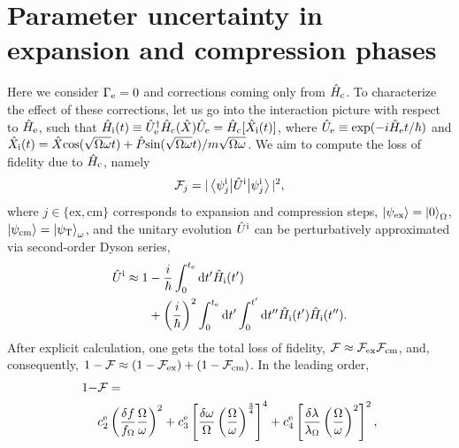 \documentclass[reprint,prx,footinbib,floatfix,twocolumn,longbibliography,superscriptaddress]{revtex4-2}
\begin{document}
\section{Parameter uncertainty in expansion and compression phases}
\label{appC}
Here we consider $\Gamma_{\text{e}} = 0$ and corrections coming only from $\hat{H}_\text{c}$.
To characterize the effect of these corrections, let us go into the interaction picture with respect to $\hat{H}_{\text{e}}$, such that $\hat{H}_\text{i} (t) \equiv \hat{U}_{\text{e}}^{\dagger} \hat{H}_\text{c} (\hat{X}) \hat{U}_{\text{e}} = \hat{H}_\text{c} [\hat{X}_{\text{i}}(t)]$, where $\hat{U}_{\text{e}} \equiv \text{exp}(- i \hat{H}_{\text{e}} t / \hbar)$ and $\hat{X}_{\text{i}} (t) = \hat{X}  \text{cos}(\sqrt{\Omega \omega } t) + \hat{P} \text{sin}(\sqrt{\Omega \omega }t) / m \sqrt{\Omega \omega } $.
We aim to compute the loss of fidelity due to $\hat{H}_\text{c}$, namely
\begin{equation}
    \mathcal{F}_j = | \expval{ \hat{U}^{\text{i}}}{ \psi_j^{\text{i}}} |^2, 
\end{equation}
where $j \in \{\text{ex},\text{cm}\}$ corresponds to expansion and compression steps, $\ket{\psi_\text{ex}} = \ket{0}_{\Omega}$, $\ket{\psi_\text{cm}} = \ket{\psi_\text{T}}_{\omega}$, and the unitary evolution $\hat{U}^{\text{i}}$ can be perturbatively approximated via second-order Dyson series,
\begin{align}
     \hat{U}^{\text{i}} \approx 1 &- \frac{i}{\hbar} \int_0^{t_{\text{e}}} \dd t' \hat{H}_\text{i} (t') \nonumber \\ &+ \left(\frac{i}{\hbar}\right)^2 \int_0^{t_{\text{e}}} \dd t' \int_0^{t'}  \dd t'' \hat{H}_\text{i} (t') \hat{H}_\text{i} (t'').
\end{align}
After explicit calculation, one gets the total loss of fidelity, $\mathcal{F} \approx \mathcal{F}_\text{ex} \mathcal{F}_\text{cm}$, and, consequently, $1 - \mathcal{F} \approx (1 - \mathcal{F}_\text{ex}) + (1 -\mathcal{F}_\text{cm})$.
In the leading order,
\begin{align}
     1 - &\mathcal{F} = \nonumber \\ & c_2^{\text{e}} \left( \frac{\delta f}{f_\Omega} \frac{\Omega}{\omega}\right)^2 +  c_3^{\text{e}}  \left[ \frac{\delta \omega}{\Omega} \left(\frac{\Omega}{\omega}\right)^{\frac{3}{4}}\right]^4 +  c_4^{\text{e}} \left[ \frac{\delta \lambda}{\lambda_\Omega} \left(\frac{\Omega}{\omega}\right)^{2}\right]^2,
\end{align}
\end{document}
